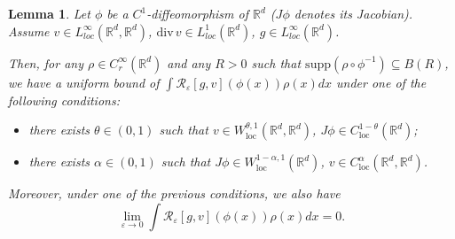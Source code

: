 \documentclass[a4paper,11pt]{article}
\newtheorem{lemma}[theorem]{Lemma}
\newcommand{\loc}{\mathrm{loc}}
\begin{document}
 \begin{lemma}
 \label{dim12} Let $\phi$ be a $C^{1}$-diffeomorphism of
 $\mathbb{R}^{d}$ ($J \phi$ denotes its Jacobian). Assume
  $ v    \in L_{loc}^{\infty}\left(
\mathbb{R}^{d},\mathbb{R}^{d}\right) $, ${\mathrm{div}\,}v\in
L_{loc}^{1}\left(  \mathbb{R}^{d}\right)$, $g    \in
L_{loc}^{\infty}\left(  \mathbb{R}^{d}\right)$.

Then, for any $\rho \in C_r^{\infty}(  \mathbb{R}^{d})$ and any
$R>0$ such that $\mathrm{supp}( \rho\circ \phi^{-1}) \subseteq
B(R)$,
 we have a uniform bound of
 $\int\mathcal{R}_{\varepsilon}\left[
g,v\right] \left(  \phi\left(  x\right)  \right)  \rho\left(
x\right)  dx $ under one of the following conditions:
\begin{itemize}
\item[(i)] there exists $\theta   \in (0,1)$ such
that
$
  v \in W_{\loc}^{\theta, 1}(
 \mathbb{R}^{d}, \mathbb{R}^{d})$, $ J\phi \in
C_{\loc}^{1 - \theta}( \mathbb{R}^{d})
$;

\item[(ii)] there exists $\alpha  \in (0,1)$ such that
$
  J \phi \in W_{\loc}^{1 - \alpha, 1}(
 \mathbb{R}^{d} ) $, $ v \in
C_{\loc}^{\alpha}( \mathbb{R}^{d}, \mathbb{R}^{d})
$.
\end{itemize}
Moreover, under one of the previous conditions, we also have
\[
\lim_{\varepsilon\rightarrow0}\int\mathcal{R}_{\varepsilon}\left[
g,v\right] \left(  \phi\left(  x\right)  \right)  \rho\left(
x\right)  dx=0.
\]
\end{lemma}
\end{document}
